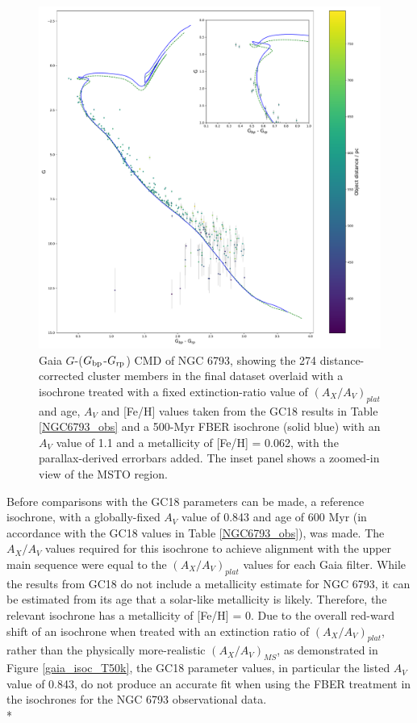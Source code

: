 \documentclass[12pt, a4paper]{report}
\begin{document}
\begin{figure}[h]
\begin{center}
\includegraphics[width=1.0\textwidth]{../NGC_6793_CMD_FeH_0p062_Av_1p1_500Myr_all_xloge_correction_no_xerr_isochrones_summary_errorbars.pdf}
\caption{Gaia $G$-($G_{\textnormal{bp}}$-$G_{\textnormal{rp}}$) CMD of NGC 6793, showing the 274 distance-corrected cluster members in the final dataset overlaid with a isochrone treated with a fixed extinction-ratio value of $(A_{X}/A_{V})_{plat}$ and age, $A_{V}$ and [Fe/H] values taken from the GC18 results in Table \ref{NGC6793_obs} and a 500-Myr FBER isochrone (solid blue) with an $A_{V}$ value of 1.1 and a metallicity of [Fe/H] = 0.062, with the parallax-derived errorbars added. The inset panel shows a zoomed-in view of the MSTO region.}
\label{NGC_6793_isoc_inset_1.1_500_0.062}
\end{center}
\end{figure}

Before comparisons with the GC18 parameters can be made, a reference isochrone, with a globally-fixed $A_{V}$ value of 0.843 and age of 600 Myr (in accordance with the GC18 values in Table \ref{NGC6793_obs}), was made. The $A_{X}/A_{V}$ values required for this isochrone to achieve alignment with the upper main sequence were equal to the $(A_{X}/A_{V})_{plat}$ values for each Gaia filter. While the results from GC18 do not include a metallicity estimate for NGC 6793, it can be estimated from its age that a solar-like metallicity is likely. Therefore, the relevant isochrone has a metallicity of [Fe/H] = 0. Due to the overall red-ward shift of an isochrone when treated with an extinction ratio of $(A_{X}/A_{V})_{plat}$, rather than the physically more-realistic $(A_{X}/A_{V})_{MS}$, as demonstrated in Figure \ref{gaia_isoc_T50k}, the GC18 parameter values, in particular the listed $A_{V}$ value of 0.843, do not produce an accurate fit when using the FBER treatment in the isochrones for the NGC 6793 observational data.\\*
\end{document}
